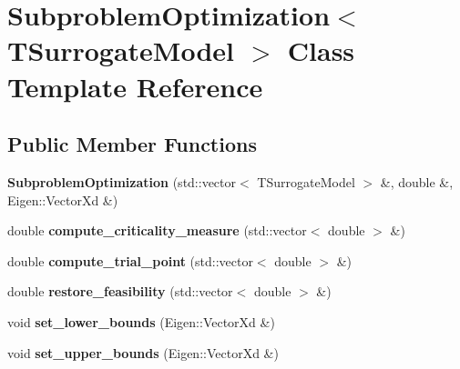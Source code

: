 \hypertarget{class_subproblem_optimization}{}\section{Subproblem\+Optimization$<$ T\+Surrogate\+Model $>$ Class Template Reference}
\label{class_subproblem_optimization}
\subsection*{Public Member Functions}
\begin{DoxyCompactItemize}
\item 
{\bfseries Subproblem\+Optimization} (std\+::vector$<$ T\+Surrogate\+Model $>$ \&, double \&, Eigen\+::\+Vector\+Xd \&)\hypertarget{class_subproblem_optimization_a7721e790d3071deb64d3022b7912015c}{}\label{class_subproblem_optimization_a7721e790d3071deb64d3022b7912015c}

\item 
double {\bfseries compute\+\_\+criticality\+\_\+measure} (std\+::vector$<$ double $>$ \&)\hypertarget{class_subproblem_optimization_aeea2d2b6b6c0fe9abee9aa8d39a4b786}{}\label{class_subproblem_optimization_aeea2d2b6b6c0fe9abee9aa8d39a4b786}

\item 
double {\bfseries compute\+\_\+trial\+\_\+point} (std\+::vector$<$ double $>$ \&)\hypertarget{class_subproblem_optimization_a02d60a43710d3f6bfdc758a28468e0ee}{}\label{class_subproblem_optimization_a02d60a43710d3f6bfdc758a28468e0ee}

\item 
double {\bfseries restore\+\_\+feasibility} (std\+::vector$<$ double $>$ \&)\hypertarget{class_subproblem_optimization_a2be5191aae85d80e9825c3f04fb86b98}{}\label{class_subproblem_optimization_a2be5191aae85d80e9825c3f04fb86b98}

\item 
void {\bfseries set\+\_\+lower\+\_\+bounds} (Eigen\+::\+Vector\+Xd \&)\hypertarget{class_subproblem_optimization_a02667802ea9a2b215a419788c9c20e2b}{}\label{class_subproblem_optimization_a02667802ea9a2b215a419788c9c20e2b}

\item 
void {\bfseries set\+\_\+upper\+\_\+bounds} (Eigen\+::\+Vector\+Xd \&)\hypertarget{class_subproblem_optimization_a71399da4c9a1c1437c832af982e58926}{}\label{class_subproblem_optimization_a71399da4c9a1c1437c832af982e58926}

\end{DoxyCompactItemize}

